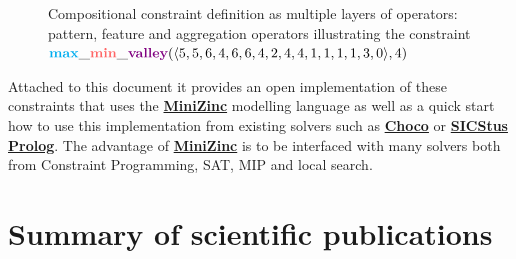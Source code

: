\documentclass{article}
\newcommand{\Constraint}[1]{\textsc{#1}}
\newcommand{\Tuple}[1]{\langle#1\rangle}  %
\begin{document}
\begin{figure}[!b]
\caption{Compositional constraint definition as multiple layers of operators: pattern, feature and aggregation operators
illustrating the constraint $\Constraint{\textcolor{cyan}{\bf max}\_\textcolor{red!60}{\bf
    min}\_\textcolor{violet}{\bf valley}} 
(\Tuple{5,5,6,4,6,6,4,2,4,4,1,1,1,1,3,0}, 4)$}
\label{fig:compositional}
\end{figure}

Attached to this document it provides an open implementation of these
constraints that uses the \href{http://www.minizinc.org/}{\bf MiniZinc}
modelling language as well as a quick start how to use this implementation
from existing solvers such as \href{http://www.choco-solver.org/}{\bf Choco}
or \href{https://sicstus.sics.se/}{\bf SICStus Prolog}.
The advantage of \href{http://www.minizinc.org/}{\bf MiniZinc} is to be interfaced
with many solvers both from Constraint Programming, SAT, MIP and local search.

\section{Summary of scientific publications}
\end{document}
